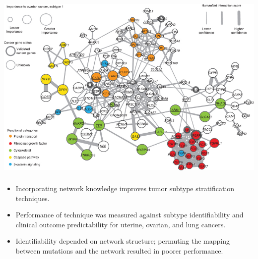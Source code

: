 \begin{frame}[fragile] \frametitle{}
    \includegraphics[width=\textwidth]{img/network_subtype.jpg}
\end{frame}
\begin{frame}[fragile] \frametitle{}
    \begin{itemize}
        \item Incorporating network knowledge improves tumor subtype
            stratification techniques.
        \item Performance of technique was measured against subtype
            identifiability and clinical outcome predictability for uterine,
            ovarian, and lung cancers.
        \item Identifiability depended on network structure; permuting the
            mapping between mutations and the network resulted in poorer
            performance.
    \end{itemize}
\end{frame}


